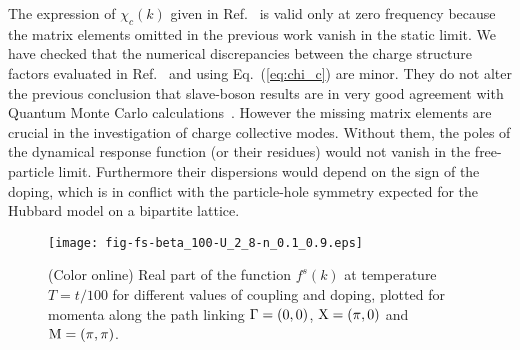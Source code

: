 \documentclass[showpacs,amsmath,twocolumn,floatfix]{revtex4-1}
\begin{document}
The expression of $\chi_c(k)$ given in Ref.~\cite{Zim97} is valid only at zero 
frequency because the matrix elements omitted in the previous work vanish in 
the static limit. 
We have checked that the numerical discrepancies between the charge 
structure factors evaluated in Ref.~\cite{Zim97} and using Eq.~(\ref{eq:chi_c}) 
are minor. They do not alter the previous conclusion that slave-boson results 
are in very good agreement with Quantum Monte Carlo calculations~\cite{Zim97,DziUnpub}. 
However the missing matrix elements are crucial in the investigation of charge 
collective modes. Without them, the poles of the dynamical response function (or 
their residues) would not vanish in the free-particle limit. Furthermore their 
dispersions would depend on the sign of the doping, which is in conflict with the 
particle-hole symmetry expected for the Hubbard model on a bipartite lattice.


\begin{figure}[b]
	 \texttt{[image: fig-fs-beta\_100-U\_2\_8-n\_0.1\_0.9.eps]}
	\caption{(Color online) Real part of the function $f^s(k)$ at temperature 
	$T=t/100$ for different values of coupling and doping,  plotted for momenta 
	along the path linking ${\rm \Gamma}=(0,0)$, ${\rm X}=(\pi,0)$ 
	and ${\rm M}=(\pi,\pi)$.  }
	\label{fig:fs}
\end{figure}
\end{document}
